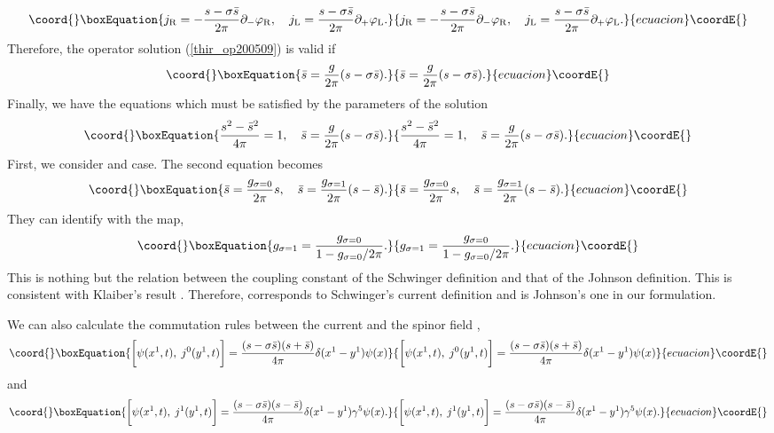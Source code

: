 \documentclass[a4paper,fleqn]{article}
\begin{document}
\begin{equation}\coord{}\boxEquation{
j_{\rm R} = - \frac{s - \sigma \bar{s}}{2 \pi} \partial_- \varphi_{\rm R}, \quad
j_{\rm L} = \frac{s - \sigma \bar{s}}{2 \pi} \partial_+ \varphi_{\rm L}.
}{
j_{\rm R} = - \frac{s - \sigma \bar{s}}{2 \pi} \partial_- \varphi_{\rm R}, \quad
j_{\rm L} = \frac{s - \sigma \bar{s}}{2 \pi} \partial_+ \varphi_{\rm L}.
}{ecuacion}\coordE{}\end{equation}
Therefore, the operator solution (\ref{thir_op200509}) is valid if
\begin{equation}\coord{}\boxEquation{
\bar{s} = \frac{g}{2 \pi}(s - \sigma \bar{s}).
}{
\bar{s} = \frac{g}{2 \pi}(s - \sigma \bar{s}).
}{ecuacion}\coordE{}\end{equation}
Finally, we have the equations which must be satisfied by the parameters of the solution
\begin{equation}\coord{}\boxEquation{
\frac{s^2 - \bar{s}^2}{4 \pi} = 1, \quad \bar{s} = \frac{g}{2 \pi}(s - \sigma \bar{s}).
}{
\frac{s^2 - \bar{s}^2}{4 \pi} = 1, \quad \bar{s} = \frac{g}{2 \pi}(s - \sigma \bar{s}).
}{ecuacion}\coordE{}\end{equation}
First, we consider \coordHE{} and \coordHE{} case. The second equation becomes
\begin{equation}\coord{}\boxEquation{
\bar{s} = \frac{g_{\sigma=0}}{2 \pi} s, \quad \bar{s} = \frac{g_{\sigma=1}}{2 \pi}(s - \bar{s}) .
}{
\bar{s} = \frac{g_{\sigma=0}}{2 \pi} s, \quad \bar{s} = \frac{g_{\sigma=1}}{2 \pi}(s - \bar{s}) .
}{ecuacion}\coordE{}\end{equation}
They can identify with the map,
\begin{equation}\coord{}\boxEquation{
g_{\sigma=1} = \frac{g_{\sigma=0}}{1- g_{\sigma=0}/ 2 \pi} .
}{
g_{\sigma=1} = \frac{g_{\sigma=0}}{1- g_{\sigma=0}/ 2 \pi} .
}{ecuacion}\coordE{}\end{equation}
This is nothing but the relation between the coupling constant of the Schwinger
definition and that of the Johnson definition. This is consistent with 
Klaiber's result \cite{kla67}. 
Therefore, \coordHE{} corresponds to  Schwinger's current definition and
\coordHE{} is  Johnson's one in our formulation.

We can also calculate the commutation rules between the current and 
the spinor field \myHighlight{$\psi$}\coordHE{},
\begin{equation}\coord{}\boxEquation{
\biggl[\psi(x^1, t), \;j^0(y^1,t)\biggr] = 
\frac{(s - \sigma \bar s)(s + \bar s)}{4 \pi} \delta(x^1 - y^1) \psi(x)
\label{com_cur1_200512}
}{
\biggl[\psi(x^1, t), \;j^0(y^1,t)\biggr] = 
\frac{(s - \sigma \bar s)(s + \bar s)}{4 \pi} \delta(x^1 - y^1) \psi(x)
}{ecuacion}\coordE{}\end{equation}
and
\begin{equation}\coord{}\boxEquation{
\biggr[\psi(x^1, t), \;j^1(y^1, t)\biggr] = 
\frac{(s - \sigma \bar s)(s - \bar s)}{4 \pi} \delta(x^1 - y^1) \gamma^5 \psi(x).
\label{com_cur2_200512}
}{
\biggr[\psi(x^1, t), \;j^1(y^1, t)\biggr] = 
\frac{(s - \sigma \bar s)(s - \bar s)}{4 \pi} \delta(x^1 - y^1) \gamma^5 \psi(x).
}{ecuacion}\coordE{}\end{equation}
\end{document}
